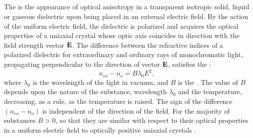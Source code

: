 \subsection{}\label{35.4.2} The  is the appearance of optical anisotropy in a transparent isotropic solid, liquid or gaseous dielectric upon being placed in an external electric field. By the action of the uniform electric field, the dielectric is polarized
and acquires the optical properties of a uniaxial crystal
whose optic axis coincides in direction with the field strength vector $\vb{E}$. The difference between the refractive indices of a polarized dielectric for extraordinary and ordinary rays of monochromatic light, propagating perpendicular to the direction of vector $\vb{E}$, satisfies the :
\begin{equation*}%
n_{eo} - n_{o} = B\lambda_{0} E^{2},
\end{equation*}
where $\lambda_{0}$ is the wavelength of the light in vacuum, and $B$ is the . The value of $B$ depends upon the nature of the substance, wavelength $\lambda_{0}$ and the temperature, decreasing, as a rule, as the temperature is raised. The sign of the difference $(n_{eo} - n_{o})$ is independent of the direction of the field. For the
majority of substances $B > 0$, so that they are similar with
respect to their optical properties in a uniform electric field
to optically positive uniaxial crystals .

